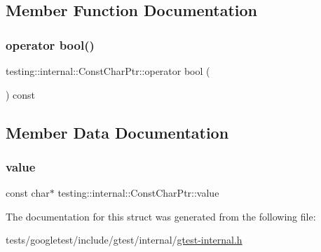 \subsection{Member Function Documentation}
\mbox{\label{structtesting_1_1internal_1_1ConstCharPtr_a85c8174b5d4db8fe96863509ba767b27}} 
\subsubsection{\texorpdfstring{operator bool()}{operator bool()}}
{\footnotesize\ttfamily testing\+::internal\+::\+Const\+Char\+Ptr\+::operator bool (\begin{DoxyParamCaption}{ }\end{DoxyParamCaption}) const\hspace{0.3cm}{\ttfamily [inline]}}



\subsection{Member Data Documentation}
\mbox{\label{structtesting_1_1internal_1_1ConstCharPtr_adba40d23d5986904b605946f643cf26e}} 
\subsubsection{\texorpdfstring{value}{value}}
{\footnotesize\ttfamily const char$\ast$ testing\+::internal\+::\+Const\+Char\+Ptr\+::value}



The documentation for this struct was generated from the following file\+:\begin{DoxyCompactItemize}
\item 
tests/googletest/include/gtest/internal/\hyperlink{gtest-internal_8h}{gtest-\/internal.\+h}\end{DoxyCompactItemize}

